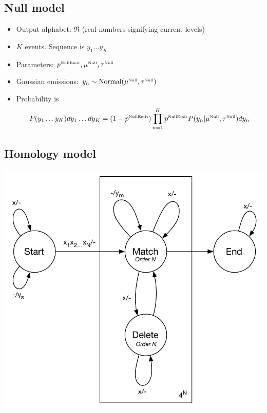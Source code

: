 \documentclass[10pt]{article}
\begin{document}
\subsection{Null model}

\begin{itemize}
\item Output alphabet: $\Re$ (real numbers signifying current levels)
\item $K$ events. Sequence is $y_1 \ldots y_K$
\item Parameters: $p^{\mbox{\tiny NullEmit}},\mu^{\mbox{\tiny Null}},\tau^{\mbox{\tiny Null}}$
\item Gaussian emissions: $y_n \sim \mbox{Normal}(\mu^{\mbox{\tiny Null}},\tau^{\mbox{\tiny Null}})$
\item Probability is
\[
P(y_1 \ldots y_K) dy_1 \ldots dy_K = \left( 1 - p^{\mbox{\tiny NullEmit}} \right)
 \prod_{n=1}^K p^{\mbox{\tiny NullEmit}} P(y_n|\mu^{\mbox{\tiny Null}},\tau^{\mbox{\tiny Null}}) dy_n
\]
\end{itemize}


\subsection{Homology model}

\includegraphics[width=\textwidth]{figs/Transducer.pdf}
\end{document}
